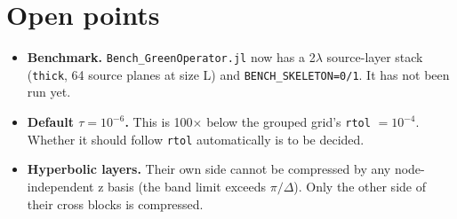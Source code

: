 \documentclass[11pt,a4paper]{article}
\newcommand{\code}[1]{\texttt{#1}}
\theoremstyle{remark}
\begin{document}
\section{Open points}
\begin{itemize}[leftmargin=*]
\item \textbf{Benchmark.} \code{Bench\_GreenOperator.jl} now has a 2$\lambda$ source-layer stack (\code{thick}, 64 source planes at size L) and
  \code{BENCH\_SKELETON=0/1}. It has not been run yet.
\item \textbf{Default $\tau=10^{-6}$.} This is 100$\times$ below the grouped grid's \code{rtol} $=10^{-4}$. Whether it should follow \code{rtol}
  automatically is to be decided.
\item \textbf{Hyperbolic layers.} Their own side cannot be compressed by any node-independent z basis (the band limit exceeds $\pi/\Delta$).
  Only the other side of their cross blocks is compressed.
\end{itemize}

\appendix
\end{document}
